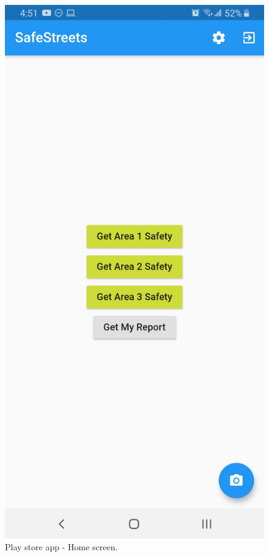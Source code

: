 \begin{figure}[H]
    \centering
    \begin{minipage}{.4\textwidth}
        \centering
        \includegraphics[width=.8\textwidth]{Images/store-home.jpg}
        \caption{\label{fig:store-home}Play store app - Home screen.}
    \end{minipage}
    \begin{minipage}{.465\textwidth}
        \centering

\end{minipage}
\end{figure}
